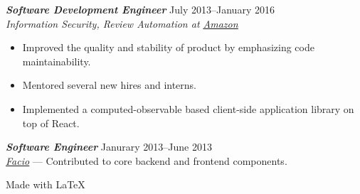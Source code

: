 \documentclass[line,letterpaper]{resume}
\begin{document}
\begin{resume}
    {\sl\textbf{Software Development Engineer}} \hfill July 2013--January
    2016\\
    \emph{Information Security, Review Automation at
    \underline{\href{http://www.amazon.com/}{Amazon}}}
    \begin{itemize}
        \item Improved the quality and stability of product by emphasizing code
            maintainability.
        \item Mentored several new hires and interns.
        \item Implemented a computed-observable based client-side application
            library on top of React.
    \end{itemize}
    \vspace{6pt}

    {\sl\textbf{Software Engineer}} \hfill Janurary 2013--June 2013\\
    \emph{\underline{\href{http://www.facio.com/}{Facio}}} ---
    Contributed to core backend and frontend components.
    \vspace{6pt}

\end{resume}

\vspace{50pt}

\hfill Made with \LaTeX{}
\end{document}
